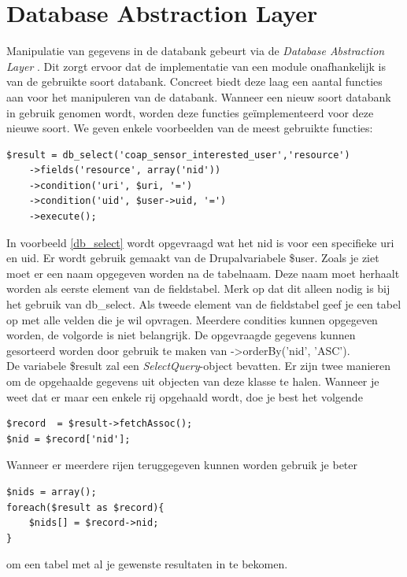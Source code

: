 \newpage
\section{Database Abstraction Layer}\label{databaseAbstractionLayer}
Manipulatie van gegevens in de databank gebeurt via de \textit{Database Abstraction Layer} \cite{databaseAbstractionLayer}. Dit zorgt ervoor dat de implementatie van een module onafhankelijk is van de gebruikte soort databank. Concreet biedt deze laag een aantal functies aan voor het manipuleren van de databank. Wanneer een nieuw soort databank in gebruik genomen wordt, worden deze functies ge\"{i}mplementeerd voor deze nieuwe soort. We geven enkele voorbeelden van de meest gebruikte functies:

\scriptsize
\lstset{language=PHP}
\begin{lstlisting}[label=db_select,caption=Voorbeeld gebruik van db\_select]
$result = db_select('coap_sensor_interested_user','resource')
	->fields('resource', array('nid'))
	->condition('uri', $uri, '=')
	->condition('uid', $user->uid, '=')
	->execute();
\end{lstlisting}
\normalsize
In voorbeeld \ref{db_select} wordt opgevraagd wat het nid is voor een specifieke uri en uid. Er wordt gebruik gemaakt van de Drupalvariabele \$user. Zoals je ziet moet er een naam opgegeven worden na de tabelnaam. Deze naam moet herhaalt worden als eerste element van de fieldstabel. Merk op dat dit alleen nodig is bij het gebruik van db\_select. Als tweede element van de fieldstabel geef je een tabel op met alle velden die je wil opvragen. Meerdere condities kunnen opgegeven worden, de volgorde is niet belangrijk. De opgevraagde gegevens kunnen gesorteerd worden door gebruik te maken van -\textgreater orderBy('nid', 'ASC').\\

De variabele \$result zal een \textit{SelectQuery}-object bevatten. Er zijn twee manieren om de opgehaalde gegevens uit objecten van deze klasse te halen. Wanneer je weet dat er maar een enkele rij opgehaald wordt, doe je best het volgende

\scriptsize
\lstset{language=PHP}
\begin{lstlisting}
$record  = $result->fetchAssoc();
$nid = $record['nid'];
\end{lstlisting} 
\normalsize
Wanneer er meerdere rijen teruggegeven kunnen worden gebruik je beter

\scriptsize
\lstset{language=PHP}
\begin{lstlisting}
$nids = array();
foreach($result as $record){
	$nids[] = $record->nid;
}
\end{lstlisting}
\normalsize
om een tabel met al je gewenste resultaten in te bekomen. %

